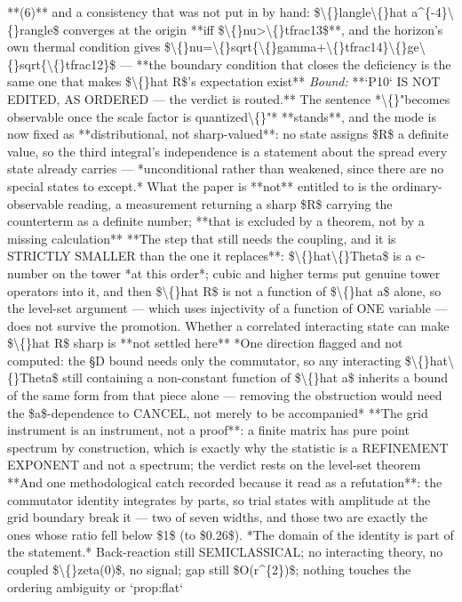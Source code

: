 \begin{description}
**(6)** and a consistency that was not put in by hand: \$\textbackslash\{\}langle\textbackslash\{\}hat a\textasciicircum{}\{-4\}\textbackslash\{\}rangle\$ converges at the origin **iff \$\textbackslash\{\}nu>\textbackslash\{\}tfrac13\$**, and the horizon's own thermal condition gives \$\textbackslash\{\}nu=\textbackslash\{\}sqrt\{\textbackslash\{\}gamma+\textbackslash\{\}tfrac14\}\textbackslash\{\}ge\textbackslash\{\}sqrt\{\textbackslash\{\}tfrac12\}\$ --- **the boundary condition that closes the deficiency is the same one that makes \$\textbackslash\{\}hat R\$'s expectation exist**
 \emph{Bound:}  **`P10` IS NOT EDITED, AS ORDERED --- the verdict is routed.** The sentence *\textbackslash\{\}"becomes observable once the scale factor is quantized\textbackslash\{\}"* **stands**, and the mode is now fixed as **distributional, not sharp-valued**: no state assigns \$R\$ a definite value, so the third integral's independence is a statement about the spread every state already carries --- *unconditional rather than weakened, since there are no special states to except.*  What the paper is **not** entitled to is the ordinary-observable reading, a measurement returning a sharp \$R\$ carrying the counterterm as a definite number; **that is excluded by a theorem, not by a missing calculation**  **The step that still needs the coupling, and it is STRICTLY SMALLER than the one it replaces**: \$\textbackslash\{\}hat\textbackslash\{\}Theta\$ is a c-number on the tower *at this order*; cubic and higher terms put genuine tower operators into it, and then \$\textbackslash\{\}hat R\$ is not a function of \$\textbackslash\{\}hat a\$ alone, so the level-set argument --- which uses injectivity of a function of ONE variable --- does not survive the promotion. Whether a correlated interacting state can make \$\textbackslash\{\}hat R\$ sharp is **not settled here**  *One direction flagged and not computed: the \S{}D bound needs only the commutator, so any interacting \$\textbackslash\{\}hat\textbackslash\{\}Theta\$ still containing a non-constant function of \$\textbackslash\{\}hat a\$ inherits a bound of the same form from that piece alone --- removing the obstruction would need the \$a\$-dependence to CANCEL, not merely to be accompanied*  **The grid instrument is an instrument, not a proof**: a finite matrix has pure point spectrum by construction, which is exactly why the statistic is a REFINEMENT EXPONENT and not a spectrum; the verdict rests on the level-set theorem  **And one methodological catch recorded because it read as a refutation**: the commutator identity integrates by parts, so trial states with amplitude at the grid boundary break it --- two of seven widths, and those two are exactly the ones whose ratio fell below \$1\$ (to \$0.26\$). *The domain of the identity is part of the statement.*  Back-reaction still SEMICLASSICAL; no interacting theory, no coupled \$\textbackslash\{\}zeta(0)\$, no signal; gap still \$O(r\textasciicircum{}\{2\})\$; nothing touches the ordering ambiguity or `prop:flat`

\end{description}
